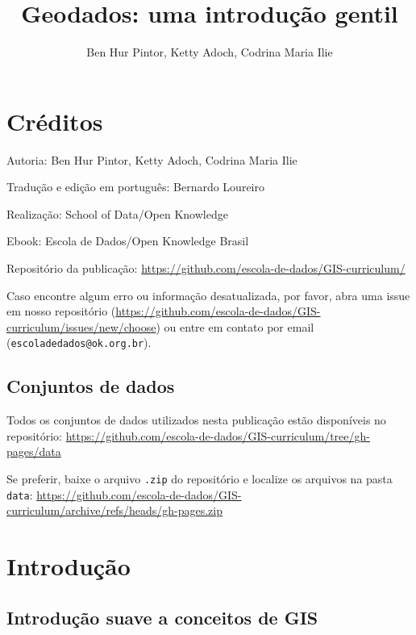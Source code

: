 \documentclass[
  portuguese,
]{krantz}
\title{Geodados: uma introdução gentil}
\author{Ben Hur Pintor, Ketty Adoch, Codrina Maria Ilie}
\date{}
\begin{document}
\maketitle

{
\hypersetup{linkcolor=}
\setcounter{tocdepth}{1}
\tableofcontents
}
\hypertarget{cruxe9ditos}{%
\chapter{Créditos}\label{cruxe9ditos}}

Autoria: Ben Hur Pintor, Ketty Adoch, Codrina Maria Ilie

Tradução e edição em português: Bernardo Loureiro

Realização: School of Data/Open Knowledge

Ebook: Escola de Dados/Open Knowledge Brasil

Repositório da publicação: \url{https://github.com/escola-de-dados/GIS-curriculum/}

Caso encontre algum erro ou informação desatualizada, por favor, abra uma issue em nosso repositório (\url{https://github.com/escola-de-dados/GIS-curriculum/issues/new/choose}) ou entre em contato por email (\texttt{escoladedados@ok.org.br}).

\hypertarget{conjuntos-de-dados}{%
\section{Conjuntos de dados}\label{conjuntos-de-dados}}

Todos os conjuntos de dados utilizados nesta publicação estão disponíveis no repositório: \url{https://github.com/escola-de-dados/GIS-curriculum/tree/gh-pages/data}

Se preferir, baixe o arquivo \texttt{.zip} do repositório e localize os arquivos na pasta \texttt{data}: \url{https://github.com/escola-de-dados/GIS-curriculum/archive/refs/heads/gh-pages.zip}

\hypertarget{introduuxe7uxe3o}{%
\chapter{Introdução}\label{introduuxe7uxe3o}}

\hypertarget{introduuxe7uxe3o-suave-a-conceitos-de-gis}{%
\section{Introdução suave a conceitos de GIS}\label{introduuxe7uxe3o-suave-a-conceitos-de-gis}}
\end{document}
